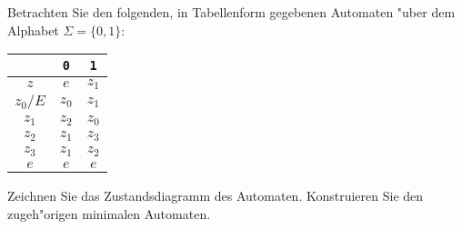 Betrachten Sie den folgenden, in Tabellenform gegebenen
Automaten "uber dem Alphabet $\Sigma=\{0,1\}$:
\begin{center}
\begin{tabular}{|c|cc|}
\hline
&{\tt 0}&{\tt 1}\\
\hline
$z$&$e$&$z_1$\\
$z_0/E$&$z_0$&$z_1$\\
$z_1$&$z_2$&$z_0$\\
$z_2$&$z_1$&$z_3$\\
$z_3$&$z_1$&$z_2$\\
$e$&$e$&$e$\\
\hline
\end{tabular}
\end{center}
Zeichnen Sie das Zustandsdiagramm des Automaten. Konstruieren Sie den
zugeh"origen minimalen Automaten.

